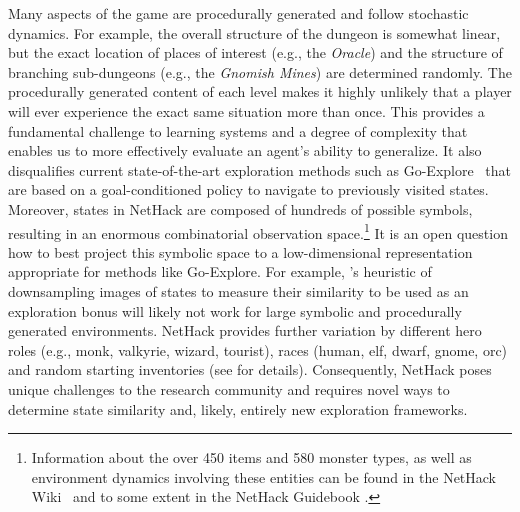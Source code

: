 \documentclass{article}
\begin{document}
Many aspects of the game are procedurally generated and follow
stochastic dynamics.  For example, the overall structure of the
dungeon is somewhat linear, but the exact location of places of
interest (e.g., the \emph{Oracle}) and the structure of branching
sub-dungeons (e.g., the \emph{Gnomish Mines}) are determined
randomly.
The procedurally generated content of each level makes it highly
unlikely that a player will ever experience the exact same situation more than once.
This provides a fundamental challenge to learning systems and a degree
of complexity that enables us to more effectively evaluate an agent's
ability to generalize.
It also disqualifies current state-of-the-art exploration methods such as Go-Explore~\citep{ecoffet2019go,DBLP:journals/corr/abs-2004-12919} that are based on a goal-conditioned policy to navigate to previously visited states.
Moreover, states in NetHack are composed of hundreds of possible symbols,
resulting in an enormous combinatorial observation space.\footnote{Information about the over 450 items and
580 monster types, as well as environment dynamics
involving these entities can be found in the NetHack
Wiki~\citep{nhwiki} and to some extent in the NetHack Guidebook \citep{raymond2020guide}.}
It is an open question how to best project this symbolic space to a low-dimensional representation appropriate for methods like Go-Explore.
For example, \citeauthor{ecoffet2019go}'s heuristic of downsampling images of states to measure their similarity to be used as an exploration bonus will likely not work for large symbolic and procedurally generated environments.
NetHack provides further variation by different hero roles (e.g., monk, valkyrie, wizard, tourist), races (human, elf, dwarf, gnome, orc) and random starting inventories (see  for details).
Consequently, NetHack poses unique challenges to the research community and requires novel ways to determine state similarity and, likely, entirely new exploration frameworks.
\end{document}
